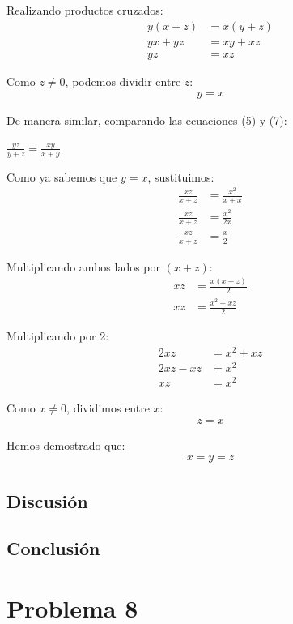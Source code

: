 \documentclass{article}
\begin{document}
Realizando productos cruzados:
\begin{align}
y(x + z) &= x(y + z) \\
yx + yz &= xy + xz \\
yz &= xz
\end{align}

Como $z \neq 0$, podemos dividir entre $z$:
\begin{align}
y = x
\end{align}

De manera similar, comparando las ecuaciones (5) y (7):

$\frac{yz}{y + z} = \frac{xy}{x + y}$

Como ya sabemos que $y = x$, sustituimos:
\begin{align}
\frac{xz}{x + z} &= \frac{x^2}{x + x} \\
\frac{xz}{x + z} &= \frac{x^2}{2x} \\
\frac{xz}{x + z} &= \frac{x}{2}
\end{align}

Multiplicando ambos lados por $(x + z)$:
\begin{align}
xz &= \frac{x(x + z)}{2} \\
xz &= \frac{x^2 + xz}{2}
\end{align}

Multiplicando por 2:
\begin{align}
2xz &= x^2 + xz \\
2xz - xz &= x^2 \\
xz &= x^2
\end{align}

Como $x \neq 0$, dividimos entre $x$:
\begin{align}
z = x
\end{align}

Hemos demostrado que:
\begin{align}
x = y = z
\end{align}

\subsection{Discusión}

\subsection{Conclusión}

\section{Problema 8}
\end{document}

